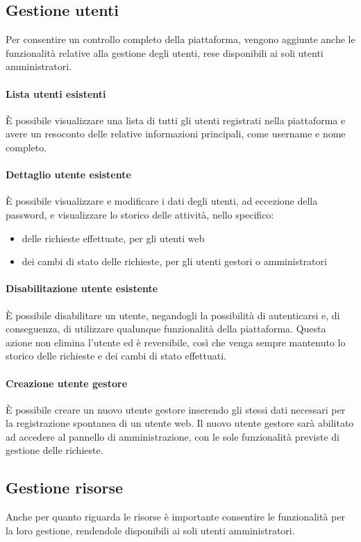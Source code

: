 \subsection{Gestione utenti}
Per consentire un controllo completo della piattaforma, vengono aggiunte anche
le funzionalità relative alla gestione degli utenti, rese disponibili ai soli
utenti amministratori.

\paragraph{Lista utenti esistenti}
È possibile visualizzare una lista di tutti gli utenti registrati nella piattaforma
e avere un resoconto delle relative informazioni principali, come username e
nome completo.

\paragraph{Dettaglio utente esistente}
È possibile visualizzare e modificare i dati degli utenti, ad eccezione della
password, e visualizzare lo storico delle attività, nello specifico:
\begin{itemize}
	\item delle richieste effettuate, per gli utenti web
	\item dei cambi di stato delle richieste, per gli utenti gestori o amministratori
\end{itemize}

\paragraph{Disabilitazione utente esistente}
È possibile disabilitare un utente, negandogli la possibilità di autenticarsi e,
di conseguenza, di utilizzare qualunque funzionalità della piattaforma.
Questa azione non elimina l'utente ed è reversibile, così che venga sempre
mantenuto lo storico delle richieste e dei cambi di stato effettuati.

\paragraph{Creazione utente gestore}
È possibile creare un nuovo utente gestore inserendo gli stessi dati necessari
per la registrazione spontanea di un utente web. Il nuovo utente gestore sarà
abilitato ad accedere al pannello di amministrazione, con le sole
funzionalità previste di gestione delle richieste.


\subsection{Gestione risorse}
Anche per quanto riguarda le risorse è importante consentire le funzionalità per
la loro gestione, rendendole disponibili ai soli utenti amministratori.

